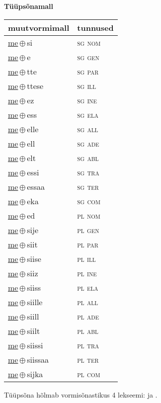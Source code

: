 

\vspace{3.5em}
\noindent \begin{minipage}{\textwidth}
\noindent \textbf{Tüüpsõnamall \,}\\

\begin{sideways}
\begin{tabular}{l l}
muutvormimall & tunnused \\
\hline
\underline{me}\,$\oplus$\,si & \textsc{ sg nom } \\
\underline{me}\,$\oplus$\,e & \textsc{ sg gen } \\
\underline{me}\,$\oplus$\,tte & \textsc{ sg par } \\
\underline{me}\,$\oplus$\,ttese & \textsc{ sg ill } \\
\underline{me}\,$\oplus$\,ez & \textsc{ sg ine } \\
\underline{me}\,$\oplus$\,ess & \textsc{ sg ela } \\
\underline{me}\,$\oplus$\,elle & \textsc{ sg all } \\
\underline{me}\,$\oplus$\,ell & \textsc{ sg ade } \\
\underline{me}\,$\oplus$\,elt & \textsc{ sg abl } \\
\underline{me}\,$\oplus$\,essi & \textsc{ sg tra } \\
\underline{me}\,$\oplus$\,essaa & \textsc{ sg ter } \\
\underline{me}\,$\oplus$\,eka & \textsc{ sg com } \\
\underline{me}\,$\oplus$\,ed & \textsc{ pl nom } \\
\underline{me}\,$\oplus$\,sije & \textsc{ pl gen } \\
\underline{me}\,$\oplus$\,siit & \textsc{ pl par } \\
\underline{me}\,$\oplus$\,siise & \textsc{ pl ill } \\
\underline{me}\,$\oplus$\,siiz & \textsc{ pl ine } \\
\underline{me}\,$\oplus$\,siiss & \textsc{ pl ela } \\
\underline{me}\,$\oplus$\,siille & \textsc{ pl all } \\
\underline{me}\,$\oplus$\,siill & \textsc{ pl ade } \\
\underline{me}\,$\oplus$\,siilt & \textsc{ pl abl } \\
\underline{me}\,$\oplus$\,siissi & \textsc{ pl tra } \\
\underline{me}\,$\oplus$\,siissaa & \textsc{ pl ter } \\
\underline{me}\,$\oplus$\,sijka & \textsc{ pl com } \\
\end{tabular}
\end{sideways}
\label{tab:tüüpsõnamall-mesi}

\end{minipage}

 
\vspace{1em}
\noindent Tüüpsõna hõlmab vormisõnastikus 4 lekseemi:  ja .
